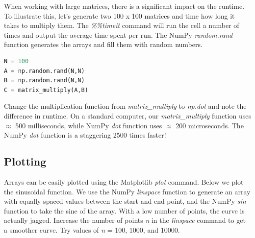 \documentclass[a4paper , 12pt]{book}
\begin{document}
When working with large matrices, there is a significant impact on the runtime. To illustrate this, let's generate two 100 x 100 matrices and time how long it takes to multiply them. The \textit{\%\%timeit} command will run the cell a number of times and output the average time spent per run. The NumPy \textit{random.rand} function generates the arrays and fill them with random numbers.

\begin{center}
\begin{lstlisting}[language=Python, frame=single]
%%timeit
N = 100
A = np.random.rand(N,N)
B = np.random.rand(N,N)
C = matrix_multiply(A,B)
\end{lstlisting}
\end{center}

Change the multiplication function from \textit{matrix\_multiply} to \textit{np.dot} and note the difference in runtime. On a standard computer, our \textit{matrix\_multiply} function uses $\approx$ 500 milliseconds, while NumPy \textit{dot} function uses $\approx$ 200 microseconds. The NumPy \textit{dot} function is a staggering 2500 times faster!

\subsection{Plotting}

Arrays can be easily plotted using the Matplotlib \textit{plot} command. Below we plot the sinusoidal function. We use the NumPy \textit{linspace} function to generate an array with equally spaced values between the start and end point, and the NumPy \textit{sin} function to take the sine of the array. With a low number of points, the curve is actually jagged. Increase the number of points \textit{n} in the \textit{linspace} command to get a smoother curve. Try values of \textit{n} = 100, 1000, and 10000.
\end{document}
